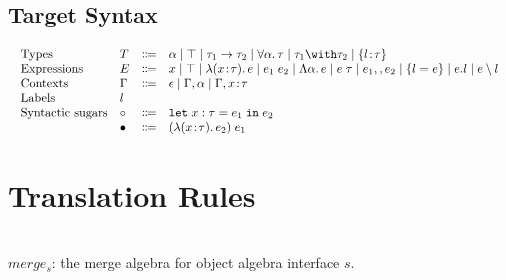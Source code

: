 \documentclass[a4paper]{article}
\begin{document}
\subsection{Target Syntax}

\begin{displaymath}
    \begin{array}{l}
      \begin{array}{llrl}
        \text{Types}
        & T & \Coloneqq & \alpha \mid \top \mid \tau_1 \to \tau_2 \mid \for \alpha \tau \mid \tau_1 \andop \tau_2 \mid \recty l \tau \\
        \text{Expressions}
        & E & \Coloneqq & x \mid \top \mid \lam x \tau e \mid \app {e_1} {e_2} \mid \blam \alpha e \mid \tapp e \tau \mid e_1 \mergeop e_2 \mid \reccon l e \mid e.l \mid e \restrictop l\\
        \text{Contexts} & \Gamma & \Coloneqq & \epsilon \mid \Gamma, \alpha \mid \Gamma, x \hast \tau \\
        \text{Labels} & l \\
        \text{Syntactic sugars} & \circ & \Coloneqq & \letexpr {x:\tau} {e_1} {e_2} \\
        & \bullet & \Coloneqq & \app {(\lam x \tau {e_2})} {e_1}
      \end{array}
    \end{array}
\end{displaymath}

\section{Translation Rules}

\begin{mathpar}








\end{mathpar}

~\\

$merge_s$: the merge algebra for object algebra interface $s$.\\
\end{document}

